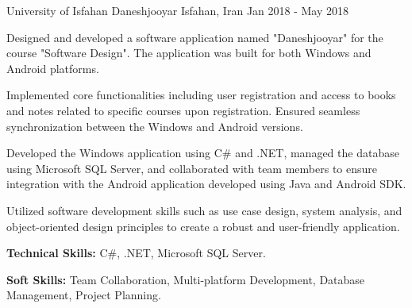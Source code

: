 \begin{cventries}
	\cventry
	{University of Isfahan} %
	{Daneshjooyar} %
	{Isfahan, Iran} %
	{Jan 2018 - May 2018} %
	{
		\begin{cvitems} %
			\item {Designed and developed a software application named "Daneshjooyar" for the course "Software Design". The application was built for both Windows and Android platforms.}
			\item {Implemented core functionalities including user registration and access to books and notes related to specific courses upon registration. Ensured seamless synchronization between the Windows and Android versions.}
			\item {Developed the Windows application using C\# and .NET, managed the database using Microsoft SQL Server, and collaborated with team members to ensure integration with the Android application developed using Java and Android SDK.}
			\item {Utilized software development skills such as use case design, system analysis, and object-oriented design principles to create a robust and user-friendly application.}
			\item {\textbf{Technical Skills:} C\#, .NET, Microsoft SQL Server.}
			\item {\textbf{Soft Skills:} Team Collaboration, Multi-platform Development, Database Management, Project Planning.}
		\end{cvitems}
}		
	\end{cventries}
